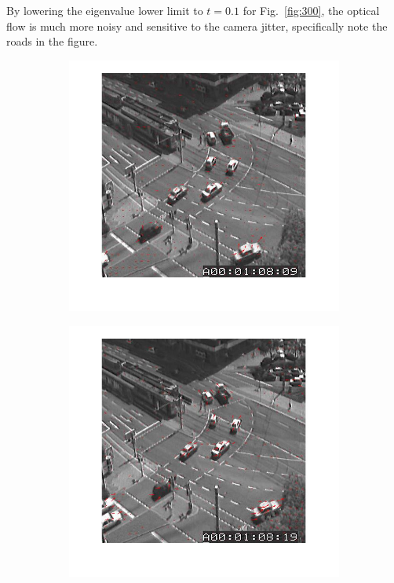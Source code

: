 \documentclass[a4paper]{iacas}
\begin{document}
By lowering the eigenvalue lower limit to $t=0.1$ for Fig.~\ref{fig:300}, the optical flow is much more noisy and sensitive to the camera jitter, specifically note the roads in the figure.

\begin{figure}[!htbp]
	\centering
	\begin{subfigure}[b]{0.4\textwidth}
		\includegraphics[width=\textwidth]{302.jpg}
		\caption{}
		\label{fig:302}
	\end{subfigure}
	\begin{subfigure}[b]{0.4\textwidth}
		\includegraphics[width=\textwidth]{303.jpg}
		\caption{}
		\label{fig:303}
	\end{subfigure}
	

\end{figure}
\end{document}
